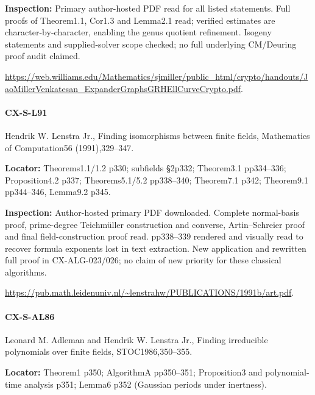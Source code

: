 \documentclass[11pt,a4paper]{article}
\begin{document}
\textbf{Inspection:} Primary author-hosted PDF read for all listed statements.\allowbreak{} Full proofs of Theorem1.\allowbreak{}1, Cor1.\allowbreak{}3 and Lemma2.\allowbreak{}1 read; verified estimates are character-by-character, enabling the genus quotient refinement.\allowbreak{} Isogeny statements and supplied-solver scope checked; no full underlying CM/\allowbreak{}Deuring proof audit claimed.\allowbreak{}

\url{https://web.williams.edu/Mathematics/sjmiller/public_html/crypto/handouts/JaoMillerVenkatesan_ExpanderGraphsGRHEllCurveCrypto.pdf}.

\paragraph{CX-S-L91} Hendrik W.\allowbreak{} Lenstra Jr.\allowbreak{}, Finding isomorphisms between finite fields, Mathematics of Computation56 (1991),329–\allowbreak{}347.

\textbf{Locator:} Theorems1.\allowbreak{}1/\allowbreak{}1.\allowbreak{}2 p330; subfields §2p332; Theorem3.\allowbreak{}1 pp334–\allowbreak{}336; Proposition4.\allowbreak{}2 p337; Theorems5.\allowbreak{}1/\allowbreak{}5.\allowbreak{}2 pp338–\allowbreak{}340; Theorem7.\allowbreak{}1 p342; Theorem9.\allowbreak{}1 pp344–\allowbreak{}346, Lemma9.\allowbreak{}2 p345.

\textbf{Inspection:} Author-hosted primary PDF downloaded.\allowbreak{} Complete normal-basis proof, prime-degree Teichmüller construction and converse, Artin–\allowbreak{}Schreier proof and final field-construction proof read.\allowbreak{} pp338–\allowbreak{}339 rendered and visually read to recover formula exponents lost in text extraction.\allowbreak{} New application and rewritten full proof in CX-ALG-023/\allowbreak{}026; no claim of new priority for these classical algorithms.\allowbreak{}

\url{https://pub.math.leidenuniv.nl/~lenstrahw/PUBLICATIONS/1991b/art.pdf}.

\paragraph{CX-S-AL86} Leonard M.\allowbreak{} Adleman and Hendrik W.\allowbreak{} Lenstra Jr.\allowbreak{}, Finding irreducible polynomials over finite fields, STOC1986,350–\allowbreak{}355.

\textbf{Locator:} Theorem1 p350; AlgorithmA pp350–\allowbreak{}351; Proposition3 and polynomial-time analysis p351; Lemma6 p352 (Gaussian periods under inertness).
\end{document}
